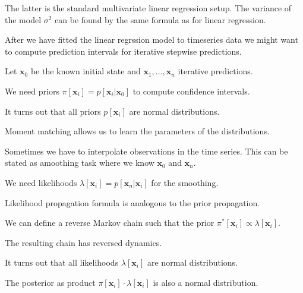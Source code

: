 \documentclass[landscape,footrule]{foils}
\renewcommand{\vec}[1]{\boldsymbol{#1}}
\begin{document}
The latter is the standard multivariate linear regression setup. The variance of the model $\sigma^2$ can be found by the same formula as for linear regression.
 
 



After we have fitted the linear regrssion model to timeseries data we might want to compute prediction intervals for iterative stepwise predictions.

\begin{triangles}
\item Let $\vec{x}_0$ be the known initial state and $\vec{x}_1, \ldots, \vec{x}_n$ iterative predictions.
\item We need priors $\pi[\vec{x}_i]=p[\vec{x}_i|\vec{x}_0]$ to compute confidence intervals.
\item It turns out that all priors $p[\vec{x}_i]$ are normal distributions.
\item Moment matching allows us to learn the parameters of the distributions.
\end{triangles}




Sometimes we have to interpolate observations in the time series. This can be stated as amoothing task where we know $\vec{x}_0$ and $\vec{x}_n$.

\begin{triangles}
\item We need likelihoods $\lambda[\vec{x}_i]=p[\vec{x}_n|\vec{x}_i]$ for the smoothing.
\item Likelihood propagation formula is analogous to the prior propagation.
\item We can define a reverse Markov chain such that the prior $\pi^*[\vec{x}_i]\propto \lambda[\vec{x}_i]$. 
\item The resulting chain has reversed dynamics. 
\item It turns out that all likelihoods $\lambda[\vec{x}_i]$ are normal distributions.
\item The posterior as product $\pi[\vec{x}_i]\cdot \lambda[\vec{x}_i]$ is also a normal distribution.
\end{triangles}
 


\end{document}
